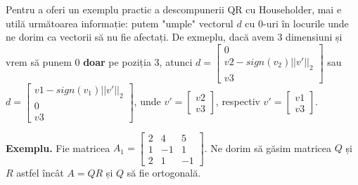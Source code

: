 \documentclass{exam}
\begin{document}
Pentru a oferi un exemplu practic a descompunerii QR cu Householder, mai
e utilă următoarea informație: putem "umple" vectorul $d$ cu 0-uri în locurile
unde ne dorim ca vectorii să nu fie afectați. De exmeplu, dacă avem 3 dimensiuni
și vrem să punem 0 \textbf{doar} pe poziția 3, atunci $d = \begin{bmatrix} 0 \\ v2 - sign(v_2) ||v'||_2 \\ v3 \end{bmatrix}$
sau $d = \begin{bmatrix} v1 - sign(v_1) ||v'||_2 \\ 0 \\ v3 \end{bmatrix}$, unde $v' = \begin{bmatrix} v2 \\ v3 \end{bmatrix}$,
respectiv $v' = \begin{bmatrix} v1 \\ v3 \end{bmatrix}$.

\textbf{Exemplu.} Fie matricea $A_1 = \begin{bmatrix} 2 & 4 & 5 \\ 1 & -1 & 1 \\ 2 & 1 & -1 \end{bmatrix}$.
Ne dorim să găsim matricea $Q$ și $R$ astfel încât $A = QR$ și $Q$ să fie ortogonală.
\end{document}

